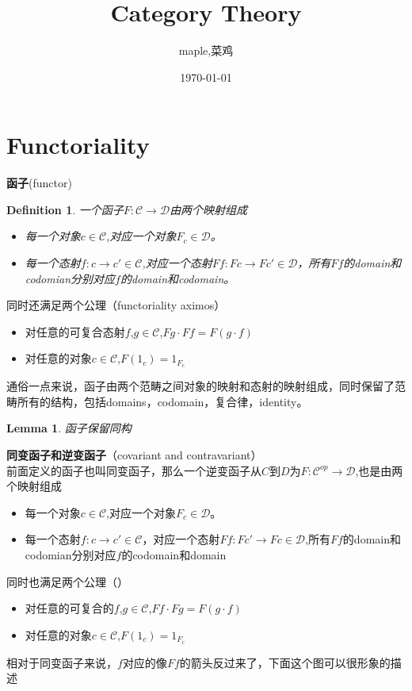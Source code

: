 \documentclass{article}
\title{Category Theory}
\author{maple,菜鸡}
\date{\today}
\newtheorem{lemma}[theorem]{Lemma}
\newtheorem{definition}[theorem]{Definition}
\begin{document}
\maketitle

\section{Functoriality}

\begin{flushleft}
\textbf{函子}(functor)\\
\begin{definition}
一个函子$F \colon \mathcal{C} \rightarrow \mathcal{D}$由两个映射组成
\begin{itemize}
 \item 每一个对象$c \in \mathcal{C}$,对应一个对象$F_c \in \mathcal{D}$。
 \item 每一个态射$f \colon c \rightarrow	c' \in \mathcal{C}$,对应一个态射$Ff \colon Fc \rightarrow Fc' \in \mathcal{D}$，所有$Ff$的domain和codomian分别对应$f$的domain和codomain。 
\end{itemize}
\end{definition}
同时还满足两个公理（functoriality aximos）
\begin{itemize}
 	\item 对任意的可复合态射$f$,$g \in \mathcal{C}$,$Fg \cdot Ff = F(g \cdot f)$
 	\item 对任意的对象$c \in \mathcal{C}$,$F(1_c)=1_{F_c}$
\end{itemize}
通俗一点来说，函子由两个范畴之间对象的映射和态射的映射组成，同时保留了范畴所有的结构，包括domains，codomain，复合律，identity。
\end{flushleft}

\begin{lemma}
函子保留同构
\end{lemma}

\begin{flushleft}
\textbf{同变函子和逆变函子}（covariant and contravariant）\\
前面定义的函子也叫同变函子，那么一个逆变函子从$C$到$D$为$F: \mathcal{C}^{op} \rightarrow \mathcal{D} $,也是由两个映射组成
\begin{itemize}
	\item 每一个对象$c \in \mathcal{C}$,对应一个对象$F_c \in \mathcal{D}$。
	\item 每一个态射$f \colon c \rightarrow	c' \in \mathcal{C}$，对应一个态射$Ff \colon Fc' \rightarrow Fc \in \mathcal{D}$,所有$Ff$的domain和codomian分别对应$f$的codomain和domain
\end{itemize}
同时也满足两个公理（）\\
\begin{itemize}
	\item 对任意的可复合的$f$,$g \in \mathcal{C}$,$Ff \cdot Fg = F(g \cdot f)$
	\item 对任意的对象$c \in \mathcal{C}$,$F(1_c)=1_{F_c}$
\end{itemize}
相对于同变函子来说，$f$对应的像$Ff$的箭头反过来了，下面这个图可以很形象的描述	
\end{flushleft}
\end{document}
